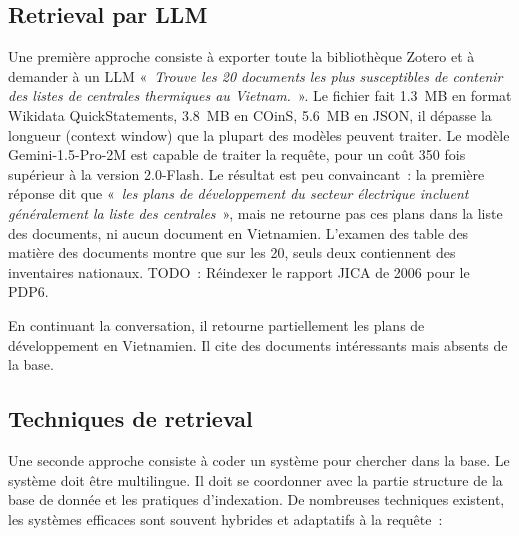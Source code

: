 \documentclass[a4paper,11pt]{report}
\begin{document}
\subsection{Retrieval par LLM}\label{retrieval-par-llm}

Une première approche consiste à exporter toute la bibliothèque Zotero et à demander à un LLM «~\emph{Trouve les 20 documents les plus susceptibles de contenir des listes de centrales thermiques au Vietnam.}~». Le fichier fait 1.3~MB en format Wikidata QuickStatements, 3.8~MB en COinS, 5.6~MB en JSON, il dépasse la longueur (context window) que la plupart des modèles peuvent traiter. Le modèle Gemini-1.5-Pro-2M est capable de traiter la requête, pour un coût 350 fois supérieur à la version 2.0-Flash. Le résultat est peu convaincant~: la première réponse dit que «~\emph{les plans de développement du secteur électrique \emph{incluent généralement la liste des centrales}}~», mais ne retourne pas ces plans dans la liste des documents, ni aucun document en Vietnamien. L'examen des table des matière des documents montre que sur les 20, seuls deux contiennent des inventaires nationaux. TODO~: Réindexer le rapport JICA de 2006 pour le PDP6.

En continuant la conversation, il retourne partiellement les plans de développement en Vietnamien. Il cite des documents intéressants mais absents de la base.

\subsection{Techniques de retrieval}\label{techniques-de-retrieval}

Une seconde approche consiste à coder un système pour chercher dans la base. Le système doit être multilingue. Il doit se coordonner avec la partie structure de la base de donnée et les pratiques d'indexation. De nombreuses techniques existent, les systèmes efficaces sont souvent hybrides et adaptatifs à la requête~:
\end{document}
